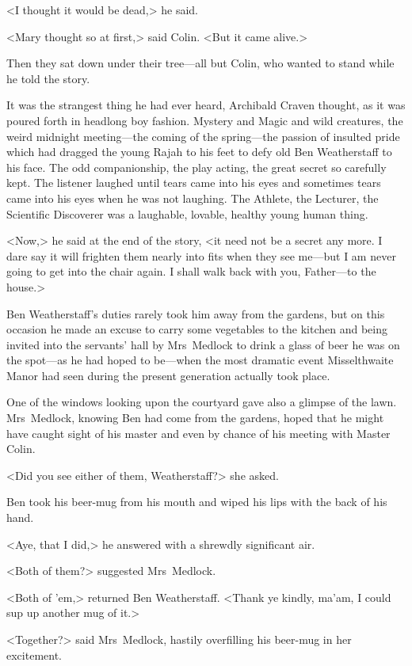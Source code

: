 <I thought it would be dead,> he said.

<Mary thought so at first,> said Colin. <But it came alive.>

Then they sat down under their tree—all but Colin, who wanted to stand while he told the story.

It was the strangest thing he had ever heard, Archibald Craven thought, as it was poured forth in headlong boy fashion. Mystery and Magic and wild creatures, the weird midnight meeting—the coming of the spring—the passion of insulted pride which had dragged the young Rajah to his feet to defy old Ben Weatherstaff to his face. The odd companionship, the play acting, the great secret so carefully kept. The listener laughed until tears came into his eyes and sometimes tears came into his eyes when he was not laughing. The Athlete, the Lecturer, the Scientific Discoverer was a laughable, lovable, healthy young human thing.

<Now,> he said at the end of the story, <it need not be a secret any more. I dare say it will frighten them nearly into fits when they see me—but I am never going to get into the chair again. I shall walk back with you, Father—to the house.>

Ben Weatherstaff's duties rarely took him away from the gardens, but on this occasion he made an excuse to carry some vegetables to the kitchen and being invited into the servants' hall by Mrs~Medlock to drink a glass of beer he was on the spot—as he had hoped to be—when the most dramatic event Misselthwaite Manor had seen during the present generation actually took place.

One of the windows looking upon the courtyard gave also a glimpse of the lawn. Mrs~Medlock, knowing Ben had come from the gardens, hoped that he might have caught sight of his master and even by chance of his meeting with Master Colin.

<Did you see either of them, Weatherstaff?> she asked.

Ben took his beer-mug from his mouth and wiped his lips with the back of his hand.

<Aye, that I did,> he answered with a shrewdly significant air.

<Both of them?> suggested Mrs~Medlock.

<Both of 'em,> returned Ben Weatherstaff. <Thank ye kindly, ma'am, I could sup up another mug of it.>

<Together?> said Mrs~Medlock, hastily overfilling his beer-mug in her excitement.

